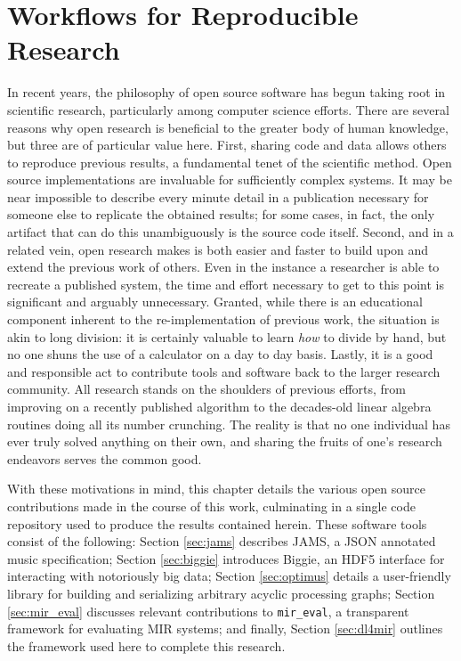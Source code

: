 

\graphicspath{{7/figures/}}

\chapter{Workflows for Reproducible Research}
\label{chp:reproducibility}

In recent years, the philosophy of open source software has begun taking root in scientific research, particularly among computer science efforts.
There are several reasons why open research is beneficial to the greater body of human knowledge, but three are of particular value here.
First, sharing code and data allows others to reproduce previous results, a fundamental tenet of the scientific method.
Open source implementations are invaluable for sufficiently complex systems.
It may be near impossible to describe every minute detail in a publication necessary for someone else to replicate the obtained results; for some cases, in fact, the only artifact that can do this unambiguously is the source code itself.
Second, and in a related vein, open research makes is both easier and faster to build upon and extend the previous work of others.
Even in the instance a researcher is able to recreate a published system, the time and effort necessary to get to this point is significant and arguably unnecessary.
Granted, while there is an educational component inherent to the re-implementation of previous work, the situation is akin to long division: it is certainly valuable to learn \emph{how} to divide by hand, but no one shuns the use of a calculator on a day to day basis.
Lastly, it is a good and responsible act to contribute tools and software back to the larger research community.
All research stands on the shoulders of previous efforts, from improving on a recently published algorithm to the decades-old linear algebra routines doing all its number crunching.
The reality is that no one individual has ever truly solved anything on their own, and sharing the fruits of one's research endeavors serves the common good.

With these motivations in mind, this chapter details the various open source contributions made in the course of this work, culminating in a single code repository used to produce the results contained herein.
These software tools consist of the following:
Section \ref{sec:jams} describes JAMS, a JSON annotated music specification;
Section \ref{sec:biggie} introduces Biggie, an HDF5 interface for interacting with notoriously big data;
Section \ref{sec:optimus} details a user-friendly library for building and serializing arbitrary acyclic processing graphs;
Section \ref{sec:mir_eval} discusses relevant contributions to \texttt{mir\_eval}, a transparent framework for evaluating MIR systems;
and finally, Section \ref{sec:dl4mir} outlines the framework used here to complete this research.


